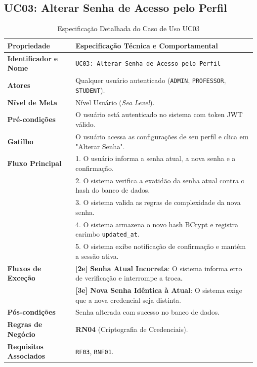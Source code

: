 \subsection{UC03: Alterar Senha de Acesso pelo Perfil}
\label{uc03_especificacao}

\begin{table}[!ht]
\centering
\caption{Especificação Detalhada do Caso de Uso UC03}
\label{tab_uc03}
\footnotesize
\begin{tabularx}{\textwidth}{p{3.5cm} X}
\toprule
\textbf{Propriedade} & \textbf{Especificação Técnica e Comportamental} \\
\midrule
\textbf{Identificador e Nome} & \texttt{UC03: Alterar Senha de Acesso pelo Perfil} \\
\textbf{Atores} & Qualquer usuário autenticado (\texttt{ADMIN}, \texttt{PROFESSOR}, \texttt{STUDENT}). \\
\textbf{Nível de Meta} & Nível Usuário (\textit{Sea Level}). \\
\textbf{Pré-condições} & O usuário está autenticado no sistema com token JWT válido. \\
\textbf{Gatilho} & O usuário acessa as configurações de seu perfil e clica em "Alterar Senha". \\
\textbf{Fluxo Principal} & 
1. O usuário informa a senha atual, a nova senha e a confirmação.\\
& 2. O sistema verifica a exatidão da senha atual contra o hash do banco de dados.\\
& 3. O sistema valida as regras de complexidade da nova senha.\\
& 4. O sistema armazena o novo hash BCrypt e registra carimbo \texttt{updated\_at}.\\
& 5. O sistema exibe notificação de confirmação e mantém a sessão ativa. \\
\textbf{Fluxos de Exceção} & 
\textbf{[2e] Senha Atual Incorreta}: O sistema informa erro de verificação e interrompe a troca.\\
& \textbf{[3e] Nova Senha Idêntica à Atual}: O sistema exige que a nova credencial seja distinta. \\
\textbf{Pós-condições} & Senha alterada com sucesso no banco de dados. \\
\textbf{Regras de Negócio} & \textbf{RN04} (Criptografia de Credenciais). \\
\textbf{Requisitos Associados} & \texttt{RF03}, \texttt{RNF01}. \\
\bottomrule
\end{tabularx}
\end{table}

